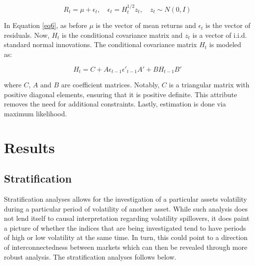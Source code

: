 \documentclass[11pt,preprint, authoryear]{elsarticle}
\numberwithin{equation}{section}
\numberwithin{figure}{section}
\numberwithin{table}{section}
\begin{document}
\begin{equation}
R_t = \mu + \epsilon_t, \quad \epsilon_t = H_t^{1/2} z_t, \quad z_t \sim N(0, I) \label{eq6}
\end{equation}

In Equation \ref{eq6}, as before \(\mu\) is the vector of mean returns
and \(\epsilon_t\) is the vector of residuals. Now, \(H_t\) is the
conditional covariance matrix and \(z_t\) is a vector of i.i.d. standard
normal innovations. The conditional covariance matrix \(H_t\) is modeled
as:

\begin{equation}
H_t = C + A \epsilon_{t-1} \epsilon'_{t-1} A' + B H_{t-1} B' \label{eq7}
\end{equation}

where \(C\), \(A\) and \(B\) are coefficient matrices. Notably, \(C\) is
a triangular matrix with positive diagonal elements, ensuring that it is
positive definite. This attribute removes the need for additional
constraints. Lastly, estimation is done via maximum likelihood.

\hypertarget{results}{%
\section{Results}\label{results}}

\hypertarget{stratification}{%
\subsection{Stratification}\label{stratification}}

Stratification analyses allows for the investigation of a particular
assets volatility during a particular period of volatility of another
asset. While such analysis does not lend itself to causal interpretation
regarding volatility spillovers, it does paint a picture of whether the
indices that are being investigated tend to have periods of high or low
volatility at the same time. In turn, this could point to a direction of
interconnectedness between markets which can then be revealed through
more robust analysis. The stratification analyses follows below.
\end{document}
